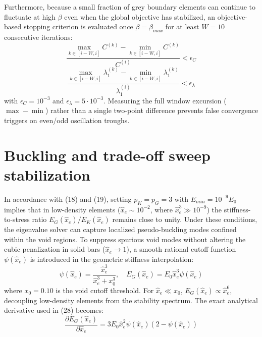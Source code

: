 \documentclass{article}
\begin{document}
Furthermore, because a small fraction of grey boundary elements can continue to fluctuate at high $\beta$ even when the global objective has stabilized, an objective-based stopping criterion is evaluated once $\beta = \beta_{max}$ for at least $W = 10$ consecutive iterations:
\begin{equation}
\frac{\max_{k \in [i-W, i]} C^{(k)} - \min_{k \in [i-W, i]} C^{(k)}}{C^{(i)}} < \epsilon_C
\end{equation}
\begin{equation}
\frac{\max_{k \in [i-W, i]} \lambda_1^{(k)} - \min_{k \in [i-W, i]} \lambda_1^{(k)}}{\lambda_1^{(i)}} < \epsilon_\lambda
\end{equation}
with $\epsilon_C = 10^{-3}$ and $\epsilon_\lambda = 5 \cdot 10^{-3}$. Measuring the full window excursion ($\max - \min$) rather than a single two-point difference prevents false convergence triggers on even/odd oscillation troughs.

\section{Buckling and trade-off sweep stabilization}

\noindent In accordance with (18) and (19), setting $p_K = p_G = 3$ with $E_{min} = 10^{-9}E_0$ implies that in low-density elements ($\hat{x}_e \sim 10^{-2}$, where $\hat{x}_e^3 \gg 10^{-9}$) the stiffness-to-stress ratio $E_G(\hat{x}_e)/E_K(\hat{x}_e)$ remains close to unity. Under these conditions, the eigenvalue solver can capture localized pseudo-buckling modes confined within the void regions. To suppress spurious void modes without altering the cubic penalization in solid bars ($\hat{x}_e \rightarrow 1$), a smooth rational cutoff function $\psi(\hat{x}_e)$ is introduced in the geometric stiffness interpolation:
\begin{equation}
\psi(\hat{x}_e) = \frac{\hat{x}_e^3}{\hat{x}_e^3 + x_0^3}, \quad E_G(\hat{x}_e) = E_0 \hat{x}_e^3 \psi(\hat{x}_e)
\end{equation}
where $x_0 = 0.10$ is the void cutoff threshold. For $\hat{x}_e \ll x_0$, $E_G(\hat{x}_e) \propto \hat{x}_e^6$, decoupling low-density elements from the stability spectrum. The exact analytical derivative used in (28) becomes:
\begin{equation}
\frac{\partial E_G(\hat{x}_e)}{\partial \hat{x}_e} = 3 E_0 \hat{x}_e^2 \psi(\hat{x}_e)\left(2 - \psi(\hat{x}_e)\right)
\end{equation}
\end{document}
